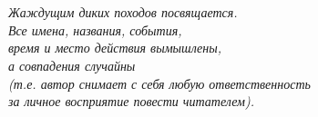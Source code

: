 \chapter*{}
\begin{flushright}
\vspace{2.0cm}
\textit{ \large {
Жаждущим диких походов посвящается.\\
\vspace{\fill}
Все имена, названия, события,\\
время и место действия вымышлены,\\
а совпадения случайны\\
(т.е. автор снимает с себя любую ответственность\\ 
за личное восприятие повести читателем).
}}
\end{flushright}


